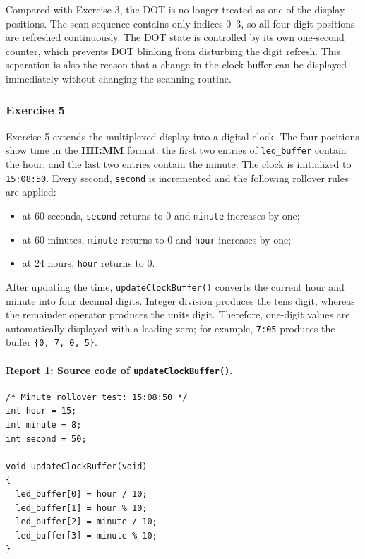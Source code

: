 Compared with Exercise 3, the DOT is no longer treated as one of the display positions. The scan sequence contains only indices 0--3, so all four digit positions are refreshed continuously. The DOT state is controlled by its own one-second counter, which prevents DOT blinking from disturbing the digit refresh. This separation is also the reason that a change in the clock buffer can be displayed immediately without changing the scanning routine.

\subsubsection{Exercise 5}

Exercise 5 extends the multiplexed display into a digital clock. The four positions show time in the \textbf{HH:MM} format: the first two entries of \texttt{led\_buffer} contain the hour, and the last two entries contain the minute. The clock is initialized to \texttt{15:08:50}. Every second, \texttt{second} is incremented and the following rollover rules are applied:
\begin{itemize}
    \item at 60 seconds, \texttt{second} returns to 0 and \texttt{minute} increases by one;
    \item at 60 minutes, \texttt{minute} returns to 0 and \texttt{hour} increases by one;
    \item at 24 hours, \texttt{hour} returns to 0.
\end{itemize}
After updating the time, \texttt{updateClockBuffer()} converts the current hour and minute into four decimal digits. Integer division produces the tens digit, whereas the remainder operator produces the units digit. Therefore, one-digit values are automatically displayed with a leading zero; for example, \texttt{7:05} produces the buffer \texttt{\{0, 7, 0, 5\}}.

\paragraph{Report 1: Source code of \texttt{updateClockBuffer()}.}

\begin{lstlisting}[caption={Conversion from hour and minute values to the four-digit display buffer}]
/* Minute rollover test: 15:08:50 */
int hour = 15;
int minute = 8;
int second = 50;

void updateClockBuffer(void)
{
  led_buffer[0] = hour / 10;
  led_buffer[1] = hour % 10;
  led_buffer[2] = minute / 10;
  led_buffer[3] = minute % 10;
}
\end{lstlisting}

